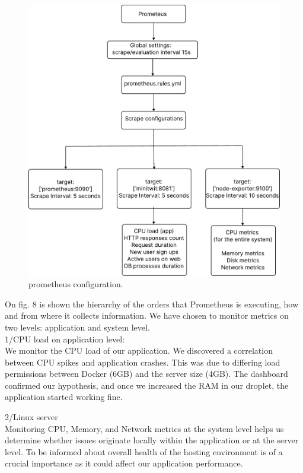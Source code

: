 \documentclass{article}
\begin{document}
\begin{figure}[ht]
    \centering
    \includegraphics[width=1.0\textwidth]{./pdfs/prometheus configuration.pdf} 
    \caption{prometheus configuration.}
    \label{fig:prometheus configuration}
\end{figure}

On fig. 8 is shown the hierarchy of the orders that Prometheus is executing, how and from where it collects information. We have chosen to monitor metrics on two levels: application and system level.
\\
1/CPU load on application level:
\\We monitor the CPU load of our application. We discovered a correlation between CPU spikes and application crashes. This was due to differing load permissions between Docker (6GB) and the server size (4GB). The dashboard confirmed our hypothesis, and once we increased the RAM in our droplet, the application started working fine.

2/Linux server 
\\Monitoring CPU, Memory, and Network metrics at the system level helps us determine whether issues originate locally within the application or at the server level. To be informed about overall health of the hosting environment is of a crucial importance as it could affect our application performance.
\end{document}
